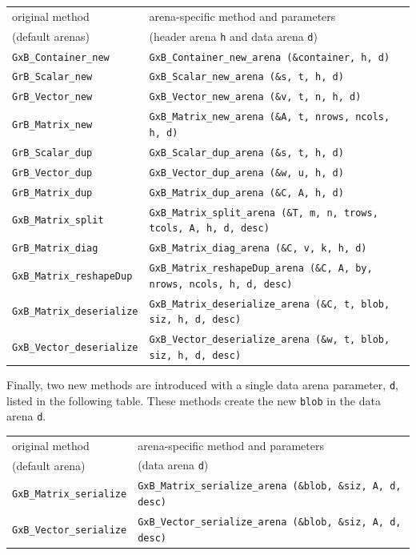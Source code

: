 \vspace{0.1in}
\noindent
{\footnotesize
\begin{tabular}{|ll|}
\hline
original method & arena-specific method and parameters  \\
(default arenas) & (header arena \verb'h' and data arena \verb'd') \\
\hline
\verb'GxB_Container_new'        & \verb'GxB_Container_new_arena (&container, h, d)' \\
\verb'GrB_Scalar_new'           & \verb'GxB_Scalar_new_arena (&s, t, h, d)' \\
\verb'GrB_Vector_new'           & \verb'GxB_Vector_new_arena (&v, t, n, h, d)' \\
\verb'GrB_Matrix_new'           & \verb'GxB_Matrix_new_arena (&A, t, nrows, ncols, h, d)' \\
\hline
\verb'GrB_Scalar_dup'           & \verb'GxB_Scalar_dup_arena (&s, t, h, d)' \\
\verb'GrB_Vector_dup'           & \verb'GxB_Vector_dup_arena (&w, u, h, d)' \\
\verb'GrB_Matrix_dup'           & \verb'GxB_Matrix_dup_arena (&C, A, h, d)' \\
\verb'GxB_Matrix_split'         & \verb'GxB_Matrix_split_arena (&T, m, n, trows, tcols, A, h, d, desc)' \\
\verb'GrB_Matrix_diag'          & \verb'GxB_Matrix_diag_arena (&C, v, k, h, d)' \\
\verb'GxB_Matrix_reshapeDup'    & \verb'GxB_Matrix_reshapeDup_arena (&C, A, by, nrows, ncols, h, d, desc)' \\
\verb'GxB_Matrix_deserialize'   & \verb'GxB_Matrix_deserialize_arena (&C, t, blob, siz, h, d, desc)' \\
\verb'GxB_Vector_deserialize'   & \verb'GxB_Vector_deserialize_arena (&w, t, blob, siz, h, d, desc)' \\
\hline
\end{tabular}}
\vspace{0.05in}

Finally, two new methods are introduced with a single data arena parameter,
\verb'd', listed in the following table.  These methods create the new
\verb'blob' in the data arena \verb'd'.

\vspace{0.1in}
\noindent
{\footnotesize
\begin{tabular}{|ll|}
\hline
original method & arena-specific method and parameters  \\
(default arena) & (data arena \verb'd') \\
\hline
\verb'GxB_Matrix_serialize'     & \verb'GxB_Matrix_serialize_arena (&blob, &siz, A, d, desc)' \\
\verb'GxB_Vector_serialize'     & \verb'GxB_Vector_serialize_arena (&blob, &siz, A, d, desc)' \\
\hline
\end{tabular}}
\vspace{0.05in}

